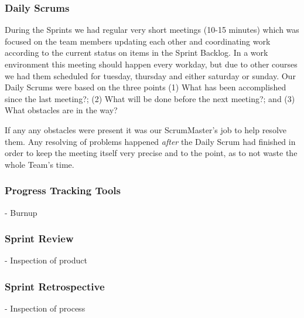 \subsubsection{Daily Scrums}
During the Sprints we had regular very short meetings (10-15 minutes) which was focused on the team members updating each other and coordinating work according to the current status on items in the Sprint Backlog. In a work environment this meeting should happen every workday, but due to other courses we had them scheduled for tuesday, thursday and either saturday or sunday. Our Daily Scrums were based on the three points (1) What has been accomplished since the last meeting?; (2) What will be done before the next meeting?; and (3) What obstacles are in the way?

If any any obstacles were present it was our ScrumMaster's job to help resolve them. Any resolving of problems happened \emph{after} the Daily Scrum had finished in order to keep the meeting itself very precise and to the point, as to not waste the whole Team's time.


\subsubsection{Progress Tracking Tools}
- Burnup

\subsubsection{Sprint Review}
- Inspection of product

\subsubsection{Sprint Retrospective}
- Inspection of process